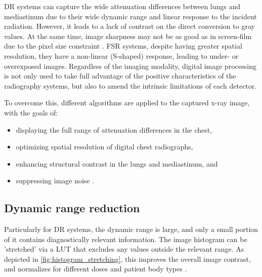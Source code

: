 \documentclass[nomenclature, english, bibtex]{kththesis}
\numberwithin{listing}{chapter}
\begin{document}
\acrfull{DR} systems can capture the wide attenuation differences between lungs and mediastinum due to
their wide dynamic range and linear response to the incident radiation. However, it leads to a lack of contrast on
the direct conversion to gray values. At the same time, image sharpness may not be as good as in screen-film
due to the pixel size constraint \cite[p.~148]{Prokop2003}. \acrfull{FSR} systems, despite having greater spatial
resolution, they have a non-linear (S-shaped) response, leading to under- or overexposed images\cite[p.~551]{vuylstekeMultiscaleImageContrast1994}.
Regardless of the imaging modality, digital image processing is not only used to take full advantage of the positive
characteristics of the radiography systems, but also to amend the intrinsic limitations of each detector.

To overcome this, different algorithms are applied to the captured x-ray image, with the goals of:

\begin{itemize}
    \item displaying the full range of attenuation differences in the chest,
    \item optimizing spatial resolution of digital chest radiographs,
    \item enhancing structural contrast in the lungs and mediastinum, and
    \item suppressing image noise \cite[p.~149]{Prokop2003}.
\end{itemize}


\subsection{Dynamic range reduction}

Particularly for \acrshort{DR} systems, the dynamic range is large, and only a small portion of it contains diagnostically
relevant information. The image histogram can be 'stretched' via a \acrfull{LUT} that excludes
any values outside the relevant range. As depicted in \autoref{fig:histogram_stretching}, this improves the overall
image contrast, and normalizes for different doses and patient body types \cite[p.~151]{Prokop2003}.
\end{document}
